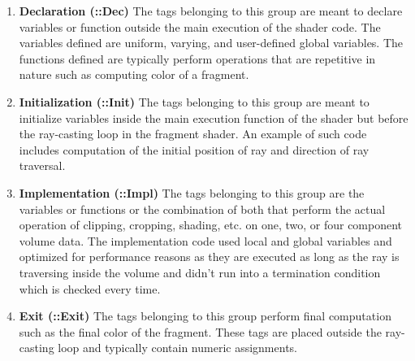 \begin{enumerate}
\label{enu:shadertags}
  \item \textbf{Declaration (::Dec)} The tags belonging to this group are meant
    to declare variables or function outside the main execution of the shader
    code.  The variables defined are uniform, varying, and user-defined global
    variables.  The functions defined are typically perform operations that are
    repetitive in nature such as computing color of a fragment.

  \item \textbf{Initialization (::Init)} The tags belonging to this group are
    meant to initialize variables inside the main execution function of the
    shader but before the ray-casting loop in the fragment shader. An example of
    such code includes computation of the initial position of ray and direction
    of ray traversal.

  \item \textbf{Implementation (::Impl)} The tags belonging to this group are
    the variables or functions or the combination of both that perform the
    actual operation of clipping, cropping, shading, etc. on one, two, or four
    component volume data.  The implementation code used local and global
    variables and optimized for performance reasons as they are executed as long
    as the ray is traversing inside the volume and didn't run into a termination
    condition which is checked every time.

  \item \textbf{Exit (::Exit)} The tags belonging to this group perform final
    computation such as the final color of the fragment. These tags are placed
    outside the ray-casting loop and typically contain numeric assignments.
\end{enumerate}

